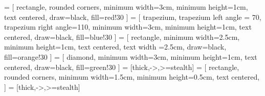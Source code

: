 
\usepackage{tikz}
\usetikzlibrary{shapes,arrows}
     = [
        rectangle,
        rounded corners,
        minimum width=3cm,
        minimum height=1cm,
        text centered, 
        draw=black,
        fill=red!30 %
        ]
     = [
        trapezium, 
        trapezium left angle = 70,
        trapezium right angle=110,
        minimum width=3cm,
        minimum height=1cm,
        text centered,
        draw=black,
        fill=blue!30 %
        ]
     = [
        rectangle,
        minimum width=2.5cm,
        minimum height=1cm,
        text centered,
        text width =2.5cm,
        draw=black,
        fill=orange!30 %
        ]
     = [
        diamond,
        minimum width=3cm,
        minimum height=1cm,
        text centered,
        draw=black,
        fill=green!30 %
        ]
     = [thick,->,>=stealth]
 = [
   rectangle,
   rounded corners,
   minimum width=1.5cm,
   minimum height=0.5cm,
   text centered, 
   ]
 = [thick,->,>=stealth]

